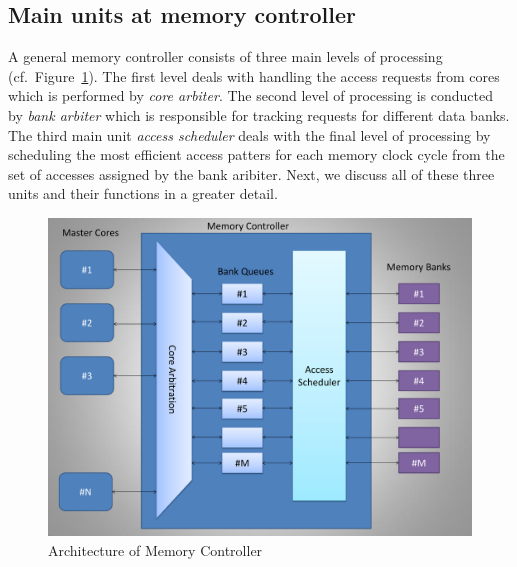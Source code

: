 \subsection{Main units at memory controller}
A general memory controller consists of three main levels of processing (cf.~Figure~\ref{fig:pseudo-code}). The first level deals with handling the access requests from cores which is performed by {\em core arbiter}. The second level of processing is conducted by {\em bank arbiter} which is responsible for tracking requests for different data banks. The third main unit {\em access scheduler} deals with the final level of processing by scheduling the most efficient access patters for each memory clock cycle from the set of accesses {\color{red} assigned by the bank aribiter}. Next, we discuss all of these three units and their functions in a greater detail.
\begin{figure}[htbp]
\centering
	\includegraphics[width=0.7\linewidth]{fig/controllerArchitecture.pdf}
\caption{
{Architecture of Memory Controller} }
\label{fig:pseudo-code}
\end{figure}
